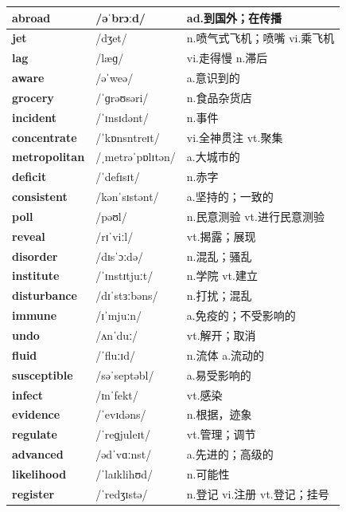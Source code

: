 \documentclass[14pt,a4paper]{extarticle}
\begin{document}
\begin{longtable}{ p{} p{} p{} }
\hline
\endfirsthead
\hline
\endhead
\endfoot
\endlastfoot

\textbf{abroad} & /əˈbrɔːd/ & ad.到国外；在传播 \\ \hline
\textbf{jet} & /dʒet/ & n.喷气式飞机；喷嘴 \quad vi.乘飞机 \\ \hline
\textbf{lag} & /læɡ/ & vi.走得慢 \quad n.滞后 \\ \hline
\textbf{aware} & /əˈweə/ & a.意识到的 \\ \hline
\textbf{grocery} & /ˈɡrəʊsəri/ & n.食品杂货店 \\ \hline
\textbf{incident} & /ˈɪnsɪdənt/ & n.事件 \\ \hline
\textbf{concentrate} & /ˈkɒnsntreɪt/ & vi.全神贯注 \quad vt.聚集 \\ \hline
\textbf{metropolitan} & /ˌmetrəˈpɒlɪtən/ & a.大城市的 \\ \hline
\textbf{deficit} & /ˈdefɪsɪt/ & n.赤字 \\ \hline
\textbf{consistent} & /kənˈsɪstənt/ & a.坚持的；一致的 \\ \hline
\textbf{poll} & /pəʊl/ & n.民意测验 \quad vt.进行民意测验 \\ \hline
\textbf{reveal} & /rɪˈviːl/ & vt.揭露；展现 \\ \hline
\textbf{disorder} & /dɪsˈɔːdə/ & n.混乱；骚乱 \\ \hline
\textbf{institute} & /ˈɪnstɪtjuːt/ & n.学院 \quad vt.建立 \\ \hline
\textbf{disturbance} & /dɪˈstɜːbəns/ & n.打扰；混乱 \\ \hline
\textbf{immune} & /ɪˈmjuːn/ & a.免疫的；不受影响的 \\ \hline
\textbf{undo} & /ʌnˈduː/ & vt.解开；取消 \\ \hline
\textbf{fluid} & /ˈfluːɪd/ & n.流体 \quad a.流动的 \\ \hline
\textbf{susceptible} & /səˈseptəbl/ & a.易受影响的 \\ \hline
\textbf{infect} & /ɪnˈfekt/ & vt.感染 \\ \hline
\textbf{evidence} & /ˈevɪdəns/ & n.根据，迹象 \\ \hline
\textbf{regulate} & /ˈreɡjuleɪt/ & vt.管理；调节 \\ \hline
\textbf{advanced} & /ədˈvɑːnst/ & a.先进的；高级的 \\ \hline
\textbf{likelihood} & /ˈlaɪklihʊd/ & n.可能性 \\ \hline
\textbf{register} & /ˈredʒɪstə/ & n.登记 \quad vi.注册 \quad vt.登记；挂号 \\ \hline

\end{longtable}
\end{document}
